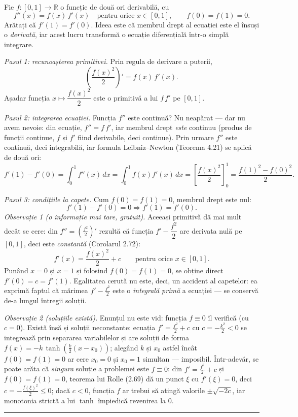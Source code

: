 Fie $f:[0,1]\to\mathbb{R}$ o funcție de două ori derivabilă, cu
\[ f''(x)=f(x)\,f'(x)\quad\text{pentru orice }x\in[0,1],\qquad f(0)=f(1)=0 . \]
Arătați că $f'(1)=f'(0)$.
\sol Ideea este că membrul drept al ecuației este el însuși o \emph{derivată}, iar acest lucru transformă o ecuație diferențială într-o simplă integrare.

\emph{Pasul 1: recunoașterea primitivei.} Prin regula de derivare a puterii,
\[ \left(\frac{f(x)^{2}}{2}\right)'=f(x)\,f'(x) . \]
Așadar funcția $x\mapsto\dfrac{f(x)^{2}}{2}$ este o primitivă a lui $f\,f'$ pe $[0,1]$.

\emph{Pasul 2: integrarea ecuației.} Funcția $f''$ este continuă? Nu neapărat --- dar nu avem nevoie: din ecuație, $f''=f\,f'$, iar membrul drept \emph{este} continuu (produs de funcții continue, $f$ și $f'$ fiind derivabile, deci continue). Prin urmare $f''$ este continuă, deci integrabilă, iar formula Leibniz--Newton (Teorema 4.21) se aplică de două ori:
\[ f'(1)-f'(0)=\int_{0}^{1}f''(x)\,dx=\int_{0}^{1}f(x)f'(x)\,dx=\left[\frac{f(x)^{2}}{2}\right]_{0}^{1}=\frac{f(1)^{2}-f(0)^{2}}{2} . \]

\emph{Pasul 3: condițiile la capete.} Cum $f(0)=f(1)=0$, membrul drept este nul:
\[ f'(1)-f'(0)=0 \Longrightarrow f'(1)=f'(0) . \]
\emph{Observație 1 (o informație mai tare, gratuit).} Aceeași primitivă dă mai mult decât se cere: din $f''=\left(\frac{f^{2}}{2}\right)'$ rezultă că funcția $f'-\dfrac{f^{2}}{2}$ are derivata nulă pe $[0,1]$, deci este \emph{constantă} (Corolarul 2.72):
\[ f'(x)=\frac{f(x)^{2}}{2}+c\qquad\text{pentru orice }x\in[0,1] . \]
Punând $x=0$ și $x=1$ și folosind $f(0)=f(1)=0$, se obține direct $f'(0)=c=f'(1)$. Egalitatea cerută nu este, deci, un accident al capetelor: ea exprimă faptul că mărimea $f'-\frac{f^{2}}{2}$ este o \emph{integrală primă} a ecuației --- se conservă de-a lungul întregii soluții.

\emph{Observație 2 (soluțiile există).} Enunțul nu este vid: funcția $f\equiv0$ îl verifică (cu $c=0$). Există însă și soluții neconstante: ecuația $f'=\frac{f^{2}}{2}+c$ cu $c=-\frac{k^{2}}{2}<0$ se integrează prin separarea variabilelor și are soluții de forma $f(x)=-k\,\tanh\!\left(\frac{k}{2}(x-x_{0})\right)$; alegând $k$ și $x_{0}$ astfel încât $f(0)=f(1)=0$ ar cere $x_{0}=0$ și $x_{0}=1$ simultan --- imposibil. Într-adevăr, se poate arăta că \emph{singura} soluție a problemei este $f\equiv0$: din $f'=\frac{f^{2}}{2}+c$ și $f(0)=f(1)=0$, teorema lui Rolle (2.69) dă un punct $\xi$ cu $f'(\xi)=0$, deci $c=-\frac{f(\xi)^{2}}{2}\le0$; dacă $c<0$, funcția $f$ ar trebui să atingă valorile $\pm\sqrt{-2c}$, iar monotonia strictă a lui $\tanh$ împiedică revenirea la $0$.
\vspace{1mm}\hrule

